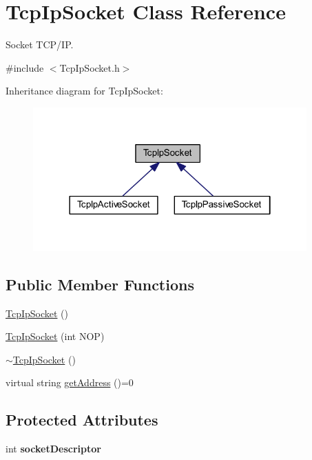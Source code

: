 \hypertarget{class_tcp_ip_socket}{
\section{TcpIpSocket Class Reference}
\label{class_tcp_ip_socket}
}


Socket TCP/IP.  




{\ttfamily \#include $<$TcpIpSocket.h$>$}



Inheritance diagram for TcpIpSocket:\nopagebreak
\begin{figure}[H]
\begin{center}
\leavevmode
\includegraphics[width=298pt]{class_tcp_ip_socket__inherit__graph}
\end{center}
\end{figure}
\subsection*{Public Member Functions}
\begin{DoxyCompactItemize}
\item 
\hyperlink{class_tcp_ip_socket_a8219c7496da306474e3aa40e74412f6c}{TcpIpSocket} ()
\item 
\hyperlink{class_tcp_ip_socket_a2c931a8f78a01fcf8d642e650632d03d}{TcpIpSocket} (int NOP)
\item 
\hyperlink{class_tcp_ip_socket_a9d57e53f73700b7905c23a538c9da9f0}{$\sim$TcpIpSocket} ()
\item 
virtual string \hyperlink{class_tcp_ip_socket_aac9c414dbb371341bb3683df39ec5021}{getAddress} ()=0
\end{DoxyCompactItemize}
\subsection*{Protected Attributes}
\begin{DoxyCompactItemize}
\item 
\hypertarget{class_tcp_ip_socket_a311edfadd88a39d2feda9a92dee7d18f}{
int {\bfseries socketDescriptor}}
\label{class_tcp_ip_socket_a311edfadd88a39d2feda9a92dee7d18f}

\end{DoxyCompactItemize}


